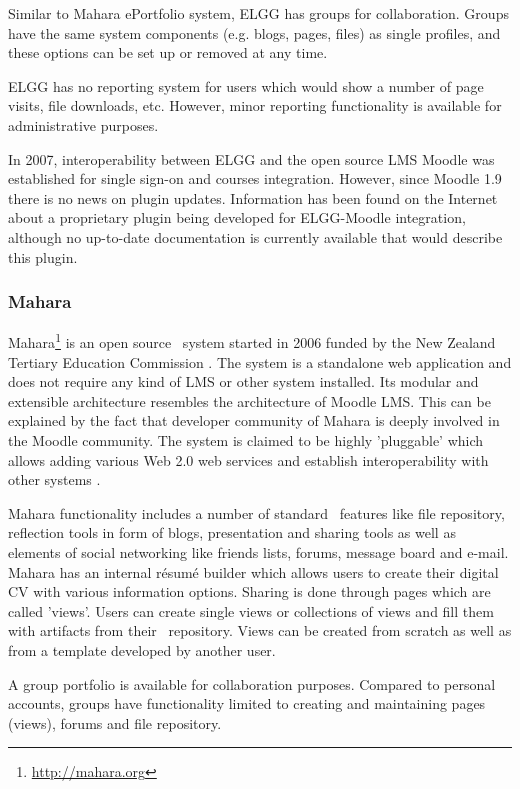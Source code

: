 Similar to Mahara ePortfolio system, ELGG has groups for collaboration. Groups
have the same system components (e.g. blogs, pages, files) as single profiles,
and these options can be set up or removed at any time.

ELGG has no reporting system for users which would show a number of page
visits, file downloads, etc. However, minor reporting functionality is available
for administrative purposes.

In 2007, interoperability between ELGG and the open source LMS Moodle was
established for single sign-on and courses integration. However, since Moodle
1.9 there is no news on plugin updates. Information has been found on the
Internet about a proprietary plugin being developed for ELGG-Moodle integration,
although no up-to-date documentation is currently available that would describe
this plugin.
 
\subsubsection{Mahara}
Mahara\footnote{\url{http://mahara.org}} is an open source \ep~system started in
2006 funded by the New Zealand Tertiary Education Commission \citep{Brown2007}.
The system is a standalone web application and does not require any kind of LMS
or other system installed. Its modular and extensible architecture resembles the
architecture of Moodle LMS. This can be explained by the fact that developer
community of Mahara is deeply involved in the Moodle community. The system is
claimed to be highly 'pluggable' which allows adding various Web 2.0 web
services and establish interoperability with other systems
\citep{MaharaGovernanceGroup2011}.

Mahara functionality includes a number of standard \ep~features like file
repository, reflection tools in form of blogs, presentation and sharing tools as
well as elements of social networking like friends lists, forums, message board
and e-mail. Mahara has an internal r\'{e}sum\'{e} builder which allows users to
create their digital CV with various information options. Sharing is done
through pages which are called 'views'. Users can create single views or
collections of views and fill them with artifacts from their \ep~repository.
Views can be created from scratch as well as from a template developed by
another user.

A group portfolio is available for collaboration purposes. Compared to personal
accounts, groups have functionality limited to creating and maintaining pages
(views), forums and file repository.

